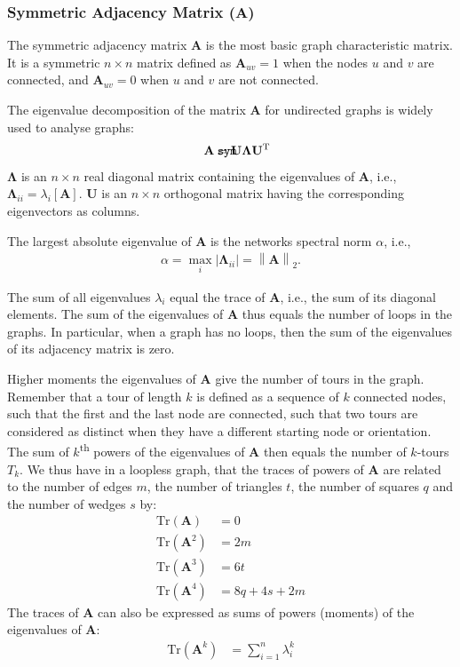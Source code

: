 \documentclass{article}
\def\mathnote#1{%
  \tag*{\rlap{\hspace\marginparsep\smash{\parbox[t]{\marginparwidth}{#1}}}}
}
\begin{document}
\subsubsection{Symmetric Adjacency Matrix ($\mathbf A$)}
\label{sec:matrix.A}
The symmetric adjacency matrix $\mathbf A$ is the most basic graph
characteristic matrix.  It is a symmetric $n \times n$ matrix defined as
$\mathbf A_{uv}=1$ when the nodes $u$ and $v$ are connected, and
$\mathbf A_{uv}=0$ when $u$ and $v$ are not connected. 

The eigenvalue decomposition of the matrix $\mathbf A$ for undirected
graphs is widely used to analyse graphs: 
\begin{align}
  \mathnote{\texttt{sym}}
  \mathbf A &= \mathbf U \mathbf \Lambda \mathbf U^{\mathrm T}
\end{align}
$\mathbf \Lambda$ is an $n \times n$ real diagonal matrix containing the
eigenvalues of $\mathbf A$, i.e., $\mathbf \Lambda_{ii} =
\lambda_i[\mathbf A]$.  
$\mathbf U$ is an $n \times n$ orthogonal matrix having the
corresponding eigenvectors as columns. 

The largest absolute eigenvalue of $\mathbf A$ is the networks spectral
norm $\alpha$, i.e.,
\begin{align*}
  \alpha = \max_i |\mathbf \Lambda_{ii}| = \left\| \mathbf A \right\|_2.
\end{align*}

The sum of all eigenvalues $\lambda_i$ equal the trace of $\mathbf A$,
i.e., the sum of its diagonal elements.  The sum of the eigenvalues of
$\mathbf A$ thus equals the number of loops in the graphs. 
In particular, when a graph
has no loops, then the sum of the eigenvalues of its adjacency matrix is
zero.  

Higher moments the eigenvalues of $\mathbf A$ give the number of tours
in the graph.  Remember that a tour of length $k$ is defined as a
sequence of $k$ connected nodes, such that the first and the last node
are connected, such that two tours are considered as distinct when they
have a different starting node or orientation. 
The sum of $k$\textsuperscript{th} powers of the
eigenvalues of $\mathbf A$ then equals the number of $k$-tours $T_k$. 
We thus have in a loopless graph, that the traces of powers of $\mathbf
A$ are related to the number of edges $m$, the number of triangles $t$,
the number of squares $q$ and the number of wedges $s$ by:
\begin{align*}
  \mathrm{Tr}(\mathbf A) &= 0 \\
  \mathrm{Tr}(\mathbf A^2) &= 2m \\
  \mathrm{Tr}(\mathbf A^3) &= 6t \\
  \mathrm{Tr}(\mathbf A^4) &= 8q + 4s + 2m
\end{align*}
The traces of $\mathbf A$ can also be expressed as sums of powers
(moments) of the eigenvalues of $\mathbf A$:
\begin{align*}
  \mathrm{Tr}(\mathbf A^k) &= \sum_{i=1}^n \lambda_i^k
\end{align*}
\end{document}
